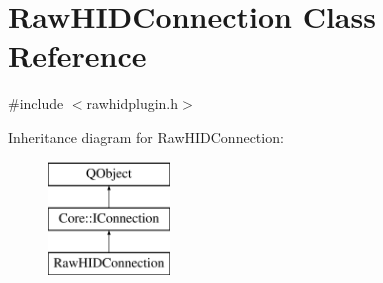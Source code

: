 \hypertarget{class_raw_h_i_d_connection}{\section{Raw\-H\-I\-D\-Connection Class Reference}
\label{class_raw_h_i_d_connection}
}


{\ttfamily \#include $<$rawhidplugin.\-h$>$}

Inheritance diagram for Raw\-H\-I\-D\-Connection\-:\begin{figure}[H]
\begin{center}
\leavevmode
\includegraphics[height=3.000000cm]{class_raw_h_i_d_connection}
\end{center}
\end{figure}
